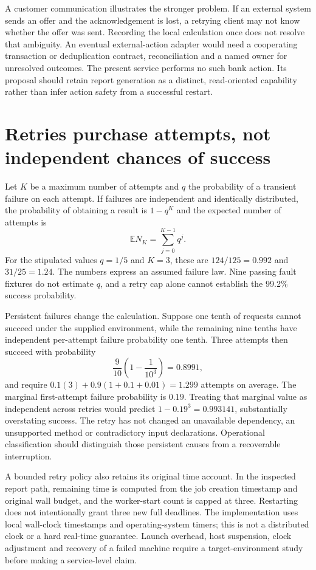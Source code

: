 A customer communication illustrates the stronger problem. If an external
system sends an offer and the acknowledgement is lost, a retrying client may
not know whether the offer was sent. Recording the local calculation once
does not resolve that ambiguity. An eventual external-action adapter would
need a cooperating transaction or deduplication contract, reconciliation and
a named owner for unresolved outcomes. The present service performs no such
bank action. Its proposal should retain report generation as a distinct,
read-oriented capability rather than infer action safety from a successful
restart.

\section{Retries purchase attempts, not independent chances of success}

Let $K$ be a maximum number of attempts and $q$ the probability of a transient
failure on each attempt. If failures are independent and identically
distributed, the probability of obtaining a result is $1-q^K$ and the
expected number of attempts is
\[
 \mathbb E N_K=\sum_{j=0}^{K-1}q^j.
\]
For the stipulated values $q=1/5$ and $K=3$, these are $124/125=0.992$
and $31/25=1.24$. The numbers express an assumed failure law. Nine passing
fault fixtures do not estimate $q$, and a retry cap alone cannot establish
the 99.2\% success probability\cite{exec13_ops_exact}.

Persistent failures change the calculation. Suppose one tenth of requests
cannot succeed under the supplied environment, while the remaining nine
tenths have independent per-attempt failure probability one tenth. Three
attempts then succeed with probability
\[
 \frac9{10}\left(1-\frac1{10^3}\right)=0.8991,
\]
and require $0.1(3)+0.9(1+0.1+0.01)=1.299$ attempts on average.
The marginal first-attempt failure probability is $0.19$. Treating that
marginal value as independent across retries would predict
$1-0.19^3=0.993141$, substantially overstating success. The retry has not
changed an unavailable dependency, an unsupported method or contradictory
input declarations. Operational classification should distinguish those
persistent causes from a recoverable interruption.

A bounded retry policy also retains its original time account. In the
inspected report path, remaining time is computed from the job creation
timestamp and original wall budget, and the worker-start count is capped at
three. Restarting does not intentionally grant three new full deadlines.
The implementation uses local wall-clock timestamps and operating-system
timers; this is not a distributed clock or a hard real-time guarantee.
Launch overhead, host suspension, clock adjustment and recovery of a failed
machine require a target-environment study before making a service-level
claim\cite{exec13_ops_source}.


